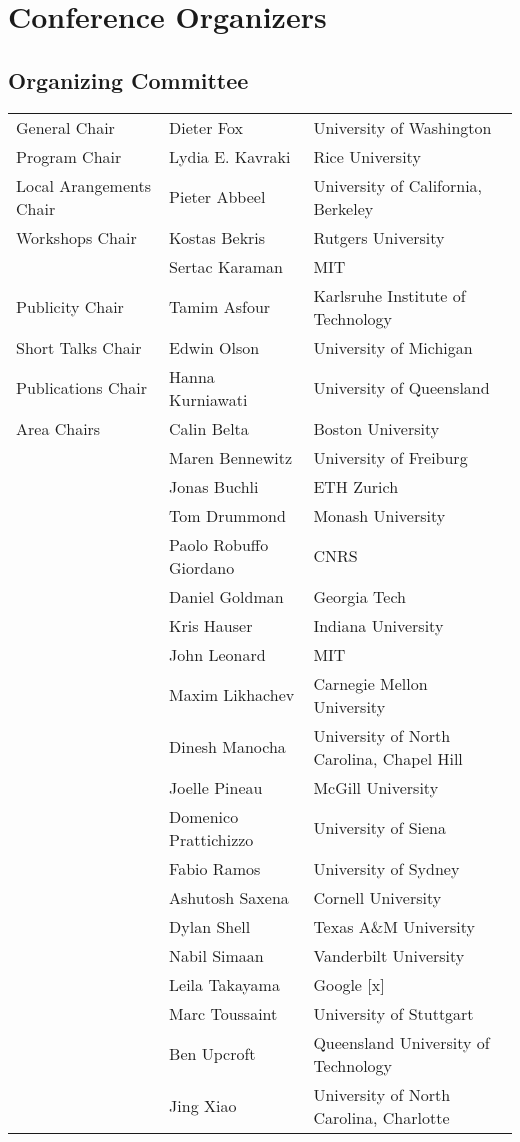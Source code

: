 \chapter{Conference Organizers}

\vspace{-1.5cm}
\section{Organizing Committee}

\begin{tabular}{>{\raggedleft}p{5cm}p{4.5cm}>{\small}p{7cm}}
General Chair & Dieter Fox & University of Washington\\
Program Chair & Lydia E. Kavraki & Rice University\\
Local Arangements Chair & Pieter Abbeel & University of California, Berkeley\\
Workshops Chair & Kostas Bekris & Rutgers University\\
& Sertac Karaman & MIT\\
Publicity Chair & Tamim Asfour & Karlsruhe Institute of Technology\\
Short Talks Chair & Edwin Olson & University of Michigan\\
Publications Chair & Hanna Kurniawati & University of Queensland\\[5mm]

Area Chairs & Calin Belta & Boston University\\
& Maren Bennewitz & University of Freiburg\\
& Jonas Buchli & ETH Zurich\\
& Tom Drummond & Monash University\\
& Paolo Robuffo Giordano & CNRS \\
& Daniel Goldman & Georgia Tech \\
& Kris Hauser & Indiana University \\
& John Leonard & MIT \\
& Maxim Likhachev & Carnegie Mellon University \\
& Dinesh Manocha & University of North Carolina, Chapel Hill\\
& Joelle Pineau & McGill University \\
& Domenico Prattichizzo & University of Siena \\
& Fabio Ramos & University of Sydney \\
& Ashutosh Saxena & Cornell University \\
& Dylan Shell & Texas A\&M University \\
& Nabil Simaan & Vanderbilt University \\
& Leila Takayama & Google [x] \\
& Marc Toussaint & University of Stuttgart \\
& Ben Upcroft & Queensland University of Technology \\
& Jing Xiao & University of North Carolina, Charlotte\\[5mm]


\end{tabular}
